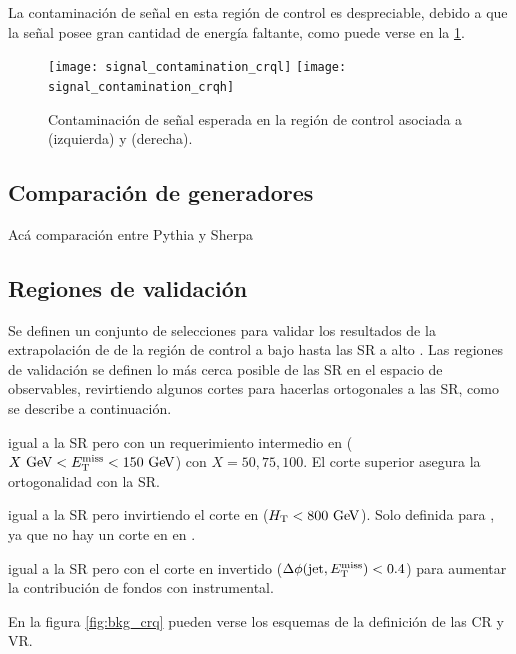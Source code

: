 La contaminación de señal en esta región de control es despreciable, debido a
que la señal posee gran cantidad de energía faltante, como puede verse en la
\cref{fig:bkg_cr_contamination}.

\begin{figure}[!htbp]
  \centering
  \texttt{[image: signal\_contamination\_crql]}
  \texttt{[image: signal\_contamination\_crqh]}

  \caption{Contaminación de señal esperada en la región de control {\CRQ} asociada a {\SRL} (izquierda) y {\SRH} (derecha).}
  \label{fig:bkg_cr_contamination}
\end{figure}




\subsection{Comparación de generadores}

Acá comparación entre Pythia y Sherpa


\subsection{Regiones de validación}\label{sec:bkg_vrs2}

Se definen un conjunto de selecciones para validar los resultados de la
extrapolación de {\gjet} de la región de control a bajo {\met} hasta
las SR a alto {\met}. Las regiones de validación se definen lo más cerca posible
de las SR en el espacio de observables, revirtiendo algunos cortes para
hacerlas ortogonales a las SR, como se describe a continuación.

\begin{description}\itemsep0.1cm
\item[{\bf VRMX}] igual a la SR pero con un requerimiento intermedio en {\met}
  ($X\gev < \met < 150\gev$) con $X = 50,75,100$. El corte superior asegura la
  ortogonalidad con la SR.
\item[{\bf VRH}] igual a la SR pero invirtiendo el corte en {\HT} ($\HT<
  800\gev$). Solo definida para {\SRH}, ya que no hay un corte en {\HT} en
  {\SRL}.
\item[{\bf VRQ}] igual a la SR pero con el corte en {\dphijm} invertido ($
  \Delta \phi (\mathrm{jet},E_{\mathrm{T}}^{\mathrm{miss}}) < 0.4$) para aumentar la contribución de fondos con {\met}
  instrumental.
\end{description}

En la figura \cref{fig:bkg_crq} pueden verse los esquemas de la definición de las CR y VR.

